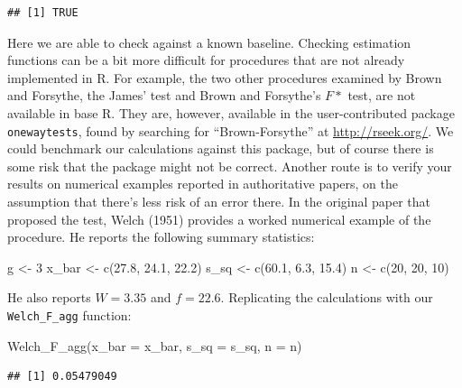 \documentclass[
]{book}
\newenvironment{Shaded}{\begin{snugshade}}{\end{snugshade}}
\newcommand{\AttributeTok}[1]{\textcolor[rgb]{0.77,0.63,0.00}{#1}}
\newcommand{\DecValTok}[1]{\textcolor[rgb]{0.00,0.00,0.81}{#1}}
\newcommand{\FloatTok}[1]{\textcolor[rgb]{0.00,0.00,0.81}{#1}}
\newcommand{\FunctionTok}[1]{\textcolor[rgb]{0.00,0.00,0.00}{#1}}
\newcommand{\NormalTok}[1]{#1}
\newcommand{\OtherTok}[1]{\textcolor[rgb]{0.56,0.35,0.01}{#1}}
\begin{document}
\begin{verbatim}
## [1] TRUE
\end{verbatim}

Here we are able to check against a known baseline.
Checking estimation functions can be a bit more difficult for procedures that are not already implemented in R. For example, the two other procedures examined by Brown and Forsythe, the James' test and Brown and Forsythe's \(F*\) test, are not available in base R.
They are, however, available in the user-contributed package \texttt{onewaytests}, found by searching for ``Brown-Forsythe'' at \url{http://rseek.org/}. We could benchmark our calculations against this package, but of course there is some risk that the package might not be correct. Another route is to verify your results on numerical examples reported in authoritative papers, on the assumption that there's less risk of an error there. In the original paper that proposed the test, Welch (1951) provides a worked numerical example of the procedure. He reports the following summary statistics:

\begin{Shaded}
\begin{Highlighting}[]
\NormalTok{g }\OtherTok{\textless{}{-}} \DecValTok{3}
\NormalTok{x\_bar }\OtherTok{\textless{}{-}} \FunctionTok{c}\NormalTok{(}\FloatTok{27.8}\NormalTok{, }\FloatTok{24.1}\NormalTok{, }\FloatTok{22.2}\NormalTok{)}
\NormalTok{s\_sq }\OtherTok{\textless{}{-}} \FunctionTok{c}\NormalTok{(}\FloatTok{60.1}\NormalTok{, }\FloatTok{6.3}\NormalTok{, }\FloatTok{15.4}\NormalTok{)}
\NormalTok{n }\OtherTok{\textless{}{-}} \FunctionTok{c}\NormalTok{(}\DecValTok{20}\NormalTok{, }\DecValTok{20}\NormalTok{, }\DecValTok{10}\NormalTok{)}
\end{Highlighting}
\end{Shaded}

He also reports \(W = 3.35\) and \(f = 22.6\). Replicating the calculations with our \texttt{Welch\_F\_agg} function:

\begin{Shaded}
\begin{Highlighting}[]
\FunctionTok{Welch\_F\_agg}\NormalTok{(}\AttributeTok{x\_bar =}\NormalTok{ x\_bar, }\AttributeTok{s\_sq =}\NormalTok{ s\_sq, }\AttributeTok{n =}\NormalTok{ n)}
\end{Highlighting}
\end{Shaded}

\begin{verbatim}
## [1] 0.05479049
\end{verbatim}
\end{document}

